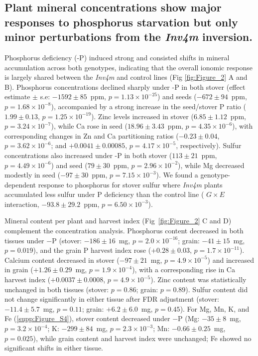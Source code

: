 \documentclass[9pt,twocolumn,twoside]{rilabRxiv}
\newcommand{\invfour}{\textit{Inv4m}\xspace}
\begin{document}
\subsection*{Plant mineral concentrations show major responses to phosphorus starvation but only minor perturbations from the \invfour inversion.}

Phosphorus deficiency (-P) induced strong and consisted shifts in mineral accumulation across both genotypes, indicating that the overall ionomic response is largely shared between the \invfour and control lines (Fig \ref{fig:Figure_2} A and B). Phosphorus concentrations declined sharply under -P in both stover (effect estimate $\pm$ s.e: $-1592 \pm 85$~ppm, $p = 1.13 \times 10^{-25}$) and seeds ($-672 \pm 94$~ppm, $p = 1.68 \times 10^{-8}$), accompanied by a strong increase in the seed/stover P ratio ($1.99 \pm 0.13$, $p = 1.25 \times 10^{-19}$). Zinc levels increased in stover ($6.85 \pm 1.12$~ppm, $p = 3.24 \times 10^{-7}$), while Ca rose in seed ($18.96 \pm 3.43$~ppm, $p = 4.35 \times 10^{-6}$), with corresponding changes in Zn and Ca partitioning ratios ($-0.23 \pm 0.04$, $p = 3.62 \times 10^{-6}$; and $+0.0041 \pm 0.00085$, $p = 4.17 \times 10^{-5}$, respectively). Sulfur concentrations also increased under -P in both stover ($113 \pm 21$~ppm, $p = 4.49 \times 10^{-6}$) and seed ($79 \pm 30$~ppm, $p = 2.96 \times 10^{-2}$), while Mg decreased modestly in seed ($-97 \pm 30$~ppm, $p = 7.15 \times 10^{-3}$). 
We found a genotype-dependent response to phosphorus for stover sulfur where \invfour plants accumulated less sulfur under P deficiency than the control line ( $G \times E$  interaction,  $-93.8 \pm 29.2$~ppm, $p = 6.50 \times 10^{-3}$).

Mineral content per plant and harvest index (Fig~\ref{fig:Figure_2} C and D) complement the concentration analysis.
Phosphorus content decreased in both tissues under $-$P (stover: $-186 \pm 16$~mg, $p = 2.0 \times 10^{-16}$; grain: $-41 \pm 15$~mg, $p = 0.019$), and the grain P harvest index rose ($+0.28 \pm 0.03$, $p = 1.7 \times 10^{-11}$).
Calcium content decreased in stover ($-97 \pm 21$~mg, $p = 4.9 \times 10^{-5}$) and increased in grain ($+1.26 \pm 0.29$~mg, $p = 1.9 \times 10^{-4}$), with a corresponding rise in Ca harvest index ($+0.0037 \pm 0.0008$, $p = 4.9 \times 10^{-5}$).
Zinc content was statistically unchanged in both tissues (stover: $p = 0.86$; grain: $p = 0.89$).
Sulfur content did not change significantly in either tissue after FDR adjustment (stover: $-11.4 \pm 5.7$~mg, $p = 0.11$; grain: $+6.2 \pm 6.0$~mg, $p = 0.45$).
For Mg, Mn, K, and Fe (\ref{supp:Figure_S4}), stover content decreased under $-$P (Mg: $-35 \pm 8$~mg, $p = 3.2 \times 10^{-4}$; K: $-299 \pm 84$~mg, $p = 2.3 \times 10^{-3}$; Mn: $-0.66 \pm 0.25$~mg, $p = 0.025$), while grain content and harvest index were unchanged; Fe showed no significant shifts in either tissue.
\end{document}
